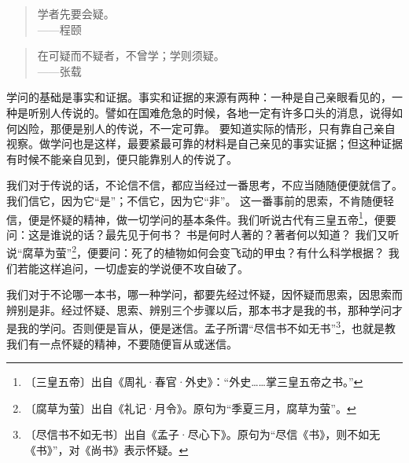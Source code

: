 \documentclass[12pt,UTF-8,openany]{ctexbook}
\begin{document}
\begin{normalsize}
    
    \begin{quotation}
    
    学者先要会疑。\\
    
    \hfill ——程颐
    
    \end{quotation}
    
    \begin{quotation}
    
    在可疑而不疑者，不曾学；学则须疑。\\
    
    \hfill ——张载
    
    \end{quotation}
    
    学问的基础是事实和证据。事实和证据的来源有两种：一种是自己亲眼看见的，一种是听别人传说的。譬如在国难危急的时候，各地一定有许多口头的消息，说得如何凶险，那便是别人的传说，不一定可靠。 要知道实际的情形，只有靠自己亲自视察。做学问也是这样，最要紧最可靠的材料是自己亲见的事实证据；但这种证据有时候不能亲自见到，便只能靠别人的传说了。
    
    我们对于传说的话，不论信不信，都应当经过一番思考，不应当随随便便就信了。我们信它，因为它“是”；不信它，因为它“非”。 这一番事前的思索，不肯随便轻信，便是怀疑的精神，做一切学问的基本条件。我们听说古代有三皇五帝\footnote{〔三皇五帝〕出自《周礼·春官·外史》：“外史……掌三皇五帝之书。”}，便要问：这是谁说的话？最先见于何书？ 书是何时人著的？著者何以知道？ 我们又听说“腐草为萤”\footnote{〔腐草为萤〕出自《礼记·月令》。原句为“季夏三月，腐草为萤”。}，便要问：死了的植物如何会变飞动的甲虫？有什么科学根据？ 我们若能这样追问，一切虚妄的学说便不攻自破了。
    
    我们对于不论哪一本书，哪一种学问，都要先经过怀疑，因怀疑而思索，因思索而辨别是非。经过怀疑、思索、辨别三个步骤以后，那本书才是我的书，那种学问才是我的学问。否则便是盲从，便是迷信。孟子所谓“尽信书不如无书”\footnote{〔尽信书不如无书〕出自《孟子·尽心下》。原句为“尽信《书》，则不如无《书》”，对《尚书》表示怀疑。}，也就是教我们有一点怀疑的精神，不要随便盲从或迷信。
    

\end{normalsize}
\end{document}
